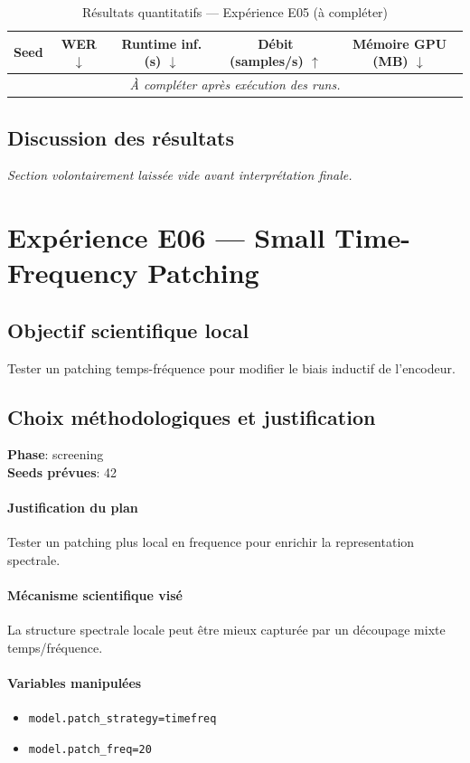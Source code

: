 \documentclass[11pt,a4paper]{article}
\begin{document}
\begin{table}[H]
\centering
\caption{Résultats quantitatifs --- Expérience E05 (à compléter)}
\begin{tabular}{lcccc}
\toprule
Seed & WER $\downarrow$ & Runtime inf. (s) $\downarrow$ & Débit (samples/s) $\uparrow$ & Mémoire GPU (MB) $\downarrow$ \\
\midrule
\multicolumn{5}{c}{\textit{À compléter après exécution des runs.}} \\
\bottomrule
\end{tabular}
\end{table}

\subsection{Discussion des résultats}
\textit{Section volontairement laissée vide avant interprétation finale.}


\section{Expérience E06 --- Small Time-Frequency Patching}
\subsection{Objectif scientifique local}
Tester un patching temps-fréquence pour modifier le biais inductif de l'encodeur.

\subsection{Choix méthodologiques et justification}
\textbf{Phase}: screening\\
\textbf{Seeds prévues}: 42\\


\paragraph{Justification du plan}
Tester un patching plus local en frequence pour enrichir la representation spectrale.

\paragraph{Mécanisme scientifique visé}
La structure spectrale locale peut être mieux capturée par un découpage mixte temps/fréquence.

\paragraph{Variables manipulées}
\begin{itemize}
\item \texttt{model.patch\_strategy=timefreq}
\item \texttt{model.patch\_freq=20}
\end{itemize}
\end{document}
